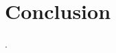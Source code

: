 \documentclass[10pt,conference,letterpaper]{IEEEtran}
\begin{document}
\section{Conclusion}
\label{sec:conclusion}

.



\end{document}
